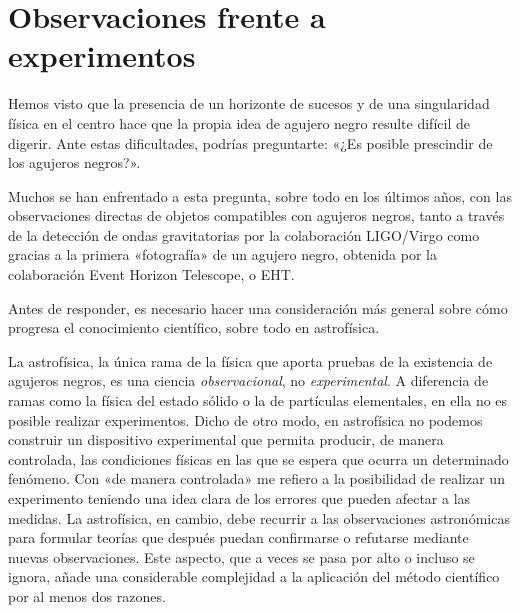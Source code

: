 \section{Observaciones frente a experimentos}\label{sec:06-observations}

Hemos visto que la presencia de un horizonte de sucesos y de una singularidad física en el centro hace que la propia idea de agujero negro resulte difícil de digerir. Ante estas dificultades, podrías preguntarte: «¿Es posible prescindir de los agujeros negros?».

Muchos se han enfrentado a esta pregunta, sobre todo en los últimos años, con las observaciones directas de objetos compatibles con agujeros negros, tanto a través de la detección de ondas gravitatorias por la colaboración LIGO/Virgo como gracias a la primera «fotografía» de un agujero negro, obtenida por la colaboración Event Horizon Telescope, o EHT.

Antes de responder, es necesario hacer una consideración más general sobre cómo progresa el conocimiento científico, sobre todo en astrofísica.

La astrofísica, la única rama de la física que aporta pruebas de la existencia de agujeros negros, es una ciencia \emph{observacional}, no \emph{experimental}. A diferencia de ramas como la física del estado sólido o la de partículas elementales, en ella no es posible realizar experimentos. Dicho de otro modo, en astrofísica no podemos construir un dispositivo experimental que permita producir, de manera controlada, las condiciones físicas en las que se espera que ocurra un determinado fenómeno. Con «de manera controlada» me refiero a la posibilidad de realizar un experimento teniendo una idea clara de los errores que pueden afectar a las medidas. La astrofísica, en cambio, debe recurrir a las observaciones astronómicas para formular teorías que después puedan confirmarse o refutarse mediante nuevas observaciones. Este aspecto, que a veces se pasa por alto o incluso se ignora, añade una considerable complejidad a la aplicación del método científico por al menos dos razones.

